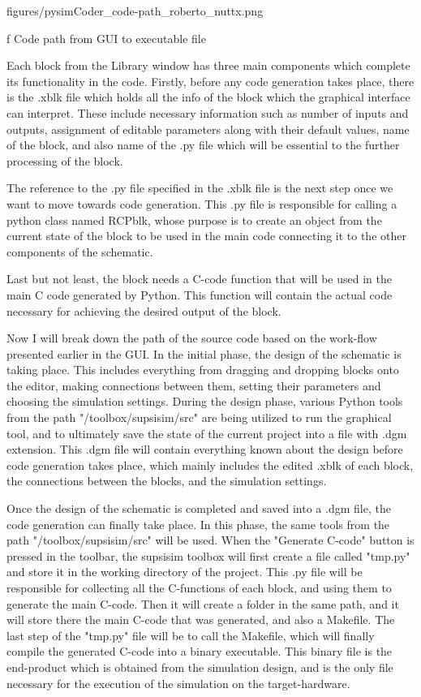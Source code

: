 \medskip {}
\picw=12cm \cinspic figures/pysimCoder_code-path_roberto_nuttx.png
\caption/f Code path from GUI to executable file
\medskip

\quad  Each block from the Library window has three main components which complete its functionality in the code. Firstly, before any
code generation takes place, there is the .xblk file which holds all the info of the block which the graphical interface can
interpret. These include necessary information such as number of inputs and outputs, assignment of editable parameters along with
their default values, name of the block, and also name of the .py file which will be essential to the further processing of the 
block.

\quad The reference to the .py file specified in the .xblk file is the next step once we want to move towards code generation.
This .py file is responsible for calling a python class named RCPblk, whose purpose is to create an object from the current state 
of the block to be used in the main code connecting it to the other components of the schematic.

\quad Last but not least, the block needs a C-code function that will be used in the main C code generated by Python. This
function will contain the actual code necessary for achieving the desired output of the block. 

\quad Now I will break down the path of the source code based on the work-flow presented earlier in the GUI. In the initial phase,
the design of the schematic is taking place. This includes everything from dragging and dropping blocks onto the editor, making 
connections between them, setting their parameters and choosing the simulation settings. During the design phase, various Python
tools from the path "/toolbox/supsisim/src" are being utilized to run the graphical tool, and to ultimately save the state of the
current project into a file with .dgm extension. This .dgm file will contain everything known about the design before code
generation takes place, which mainly includes the edited .xblk of each block, the connections between the blocks, and the
simulation settings. 

\quad Once the design of the schematic is completed and saved into a .dgm file, the code generation can finally take place.
In this phase, the same tools from the path "/toolbox/supsisim/src" will be used. When the "Generate C-code" button is pressed
in the toolbar, the supsisim toolbox will first create a file called "tmp.py" and store it in the working directory of the project.
This .py file will be responsible for collecting all the C-functions of each block, and using them to generate the main C-code.
Then it will create a folder in the same path, and it will store there the main C-code that was generated, and also a Makefile. 
The last step of the "tmp.py" file will be to call the Makefile, which will finally compile the generated C-code into a binary
executable. This binary file is the end-product which is obtained from the simulation design, and is the only file necessary 
for the execution of the simulation on the target-hardware. 

